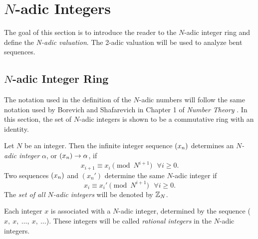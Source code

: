 \section{$N$-adic Integers}\label{sec:n-adic-ring}
\par The goal of this section is to introduce the reader to the $N$-adic
integer ring and define the {\em N-adic valuation}. The 2-adic valuation
will be used to analyze bent sequences.

\subsection{$N$-adic Integer Ring}
\par The notation used in the definition of the $N$-adic numbers will follow
the same notation used by Borevich and Shafarevich in Chapter 1 of
{\em Number Theory} \cite{bk:bs66}. In this section, the set of $N$-adic
integers is shown to be a commutative ring with an identity.
  
\begin{definition}
\label{def:N-adic}
  Let $N$ be an integer. Then the infinite integer sequence $(x_n)$
  determines an {\em $N$-adic integer} $\alpha$, or
  $(x_n) \rightarrow \alpha$, if
  \begin{equation} \label{eq:seq}
  x_{i+1} \equiv x_i\pmod{N^{i+1}} \ \ \ \forall i \geq 0.
  \end{equation}
  Two sequences $(x_n)$ and $(x_n')$ determine the same $N$-adic integer if 
\begin{equation} \label{eq:equiv}
  x_i \equiv x_i' \pmod{N^{i+1}}\ \ \ \forall i \geq 0.
\end{equation}
  The {\em set of all $N$-adic integers} will be denoted by $\mathbb{Z}_N$.
\end{definition}

\par Each integer $x$ is associated with a $N$-adic integer, determined
by the sequence ($x,\ x, \ \dots, \ x,\ \dots$). These integers will be
called {\em rational integers} in the $N$-adic integers.
	
